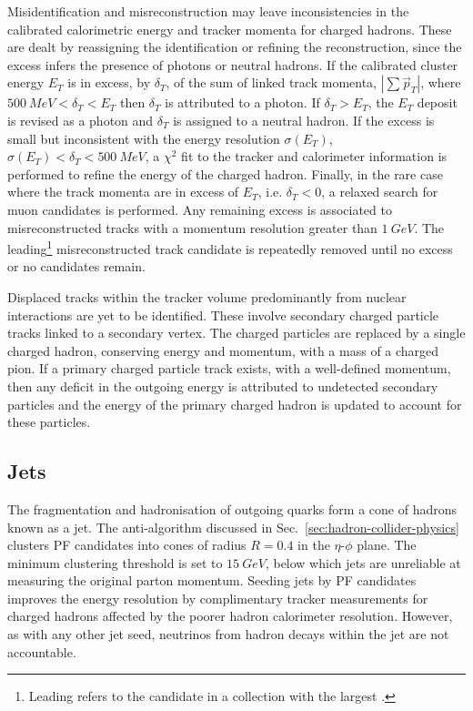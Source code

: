 Misidentification and misreconstruction may leave inconsistencies in the
calibrated calorimetric energy and tracker momenta for charged hadrons. These
are dealt by reassigning the identification or refining the reconstruction,
since the excess infers the presence of photons or neutral hadrons. If the
calibrated cluster energy $E_T$ is in excess, by $\delta_T$, of the sum of
linked track momenta, $|\sum \vec{p}_T|$, where ${\SI{500}{MeV}<\delta_T<E_T}$
then $\delta_T$ is attributed to a photon. If $\delta_T>E_T$, the $E_T$
deposit is revised as a photon and $\delta_T$ is assigned to a neutral hadron.
If the excess is small but inconsistent with the energy resolution
$\sigma(E_T)$, ${\sigma(E_T)<\delta_T<\SI{500}{MeV}}$, a $\chi^2$ fit to the
tracker and calorimeter information is performed to refine the energy of the
charged hadron. Finally, in the rare case where the track momenta are in
excess of $E_T$, i.e. $\delta_T<0$, a relaxed search for muon candidates is
performed. Any remaining excess is associated to misreconstructed tracks with
a momentum resolution greater than ${\SI{1}{GeV}}$. The leading\footnote{Leading refers to the candidate in a collection with the largest \pt.} misreconstructed track candidate is repeatedly removed until no excess or no
candidates remain.

Displaced tracks within the tracker volume predominantly from nuclear
interactions are yet to be identified. These involve secondary
charged particle tracks linked to a secondary vertex. The charged particles
are replaced by a single charged hadron, conserving energy and momentum, with
a mass of a charged pion. If a primary charged particle track exists, with a
well-defined momentum, then any deficit in the outgoing energy is attributed
to undetected secondary particles and the energy of the primary charged
hadron is updated to account for these particles.


\subsection{Jets}

The fragmentation and hadronisation of outgoing quarks form a cone of hadrons
known as a jet. The anti-\kt algorithm \cite{Cacciari:2008gp,Cacciari2012}
discussed in Sec.~\ref{sec:hadron-collider-physics} clusters PF candidates into cones of
radius $R=0.4$ in the $\eta$-$\phi$ plane.  The minimum clustering threshold
is set to $\SI{15}{GeV}$, below which jets are unreliable at measuring the original parton momentum. Seeding jets by PF candidates improves the energy
resolution by complimentary tracker measurements for charged hadrons affected
by the poorer hadron calorimeter resolution. However, as with any other jet
seed, neutrinos from hadron decays within  the jet are not accountable.


